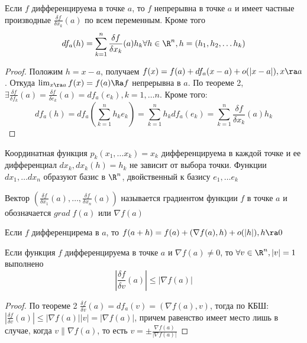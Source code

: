 
\begin{corollary}
    Если \(f\) дифференцируема в точке \(a\), то \(f\) непрерывна в точке \(a\) и имеет частные производные \(\frac{\delta f}{\delta x_k}(a)\) по всем переменным. Кроме того
    \[df_a(h) = \sum_{k = 1}^n \frac{\delta f}{\delta x_k}(a)h_k \forall h \in \R^n, h = (h_1, h_2, \dots h_k)\]
\end{corollary}
\begin{proof}
    Положим \(h = x - a\), получаем \(f(x) = f(a) + df_a(x - a) + o(|x - a|), x \ra a\). Откуда \(\lim_{x \ra a}f(x) = f(a) \Ra f\) непрерывна в \(a\). По теореме 2, \(\exists \frac{\delta f}{\delta f_k}(a) = \frac{\delta f}{\delta e_k}(a) = df_a(e_k), k = 1, \dots n\). Кроме того:
    \[df_a(h) = df_a\left(\sum_{k = 1}^n h_k e_k\right) = \sum_{k = 1}^n h_kdf_a(e_k) = \sum_{k = 1}^n \frac{\delta f}{\delta x_k}(a)h_k\]
\end{proof}

Координатная функция \(p_k(x_1, \dots x_k) = x_k\) дифференцируема в каждой точке и ее дифференциал \(dx_k, dx_k(h) = h_k\) не зависит от выбора точки. Функции \(dx_1, \dots dx_n\) образуют базис в \(\R^n\), двойственный к базису \(e_1, \dots e_k\)

\begin{definition}
    Вектор \(\left(\frac{\delta f}{\delta x_1}(a), \dots, \frac{\delta f}{\delta x_n}(a)\right)\) называется градиентом функции \(f\) в точке \(a\) и обозначается \(grad\;f(a)\) или \(\nabla f(a)\) 
\end{definition}

\begin{note}
    Если \(f\) дифференцирема в \(a\), то \(f(a + h) = f(a) + (\nabla f(a), h) + o(|h|), h \ra 0\)
\end{note}

\begin{lemma}
    Если функция \(f\) дифференцируема в точке \(a\) и \(\nabla f(a) \ne 0\), то \(\forall v \in \R^n, |v| = 1\) выполнено
    \[\left|\frac{\delta f}{\delta v}(a)\right| \le |\nabla f(a)|\]
\end{lemma}
\begin{proof}
    По теореме 2 \(\frac{\delta f}{\delta v}(a) = df_a(v) = (\nabla f(a), v)\), тогда по КБШ: 
    \(\left|\frac{\delta f}{\delta v}(a)\right| \le |\nabla f(a)||v| = |\nabla f(a)|\), причем равенство имеет место лишь в случае, когда \(v \parallel \nabla f(a)\), то есть \(v = \pm \frac{\nabla f(a)}{|\nabla f(a)|}\)
\end{proof}

